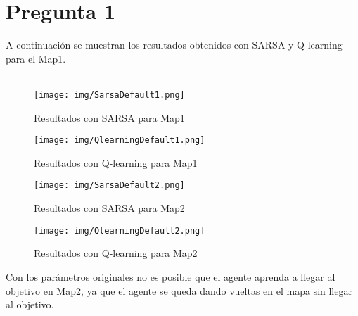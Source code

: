 \documentclass[
	spanish, %
	oneside
]{article}
\begin{document}
\newpage
\section*{Pregunta 1}

\noindent A continuación se muestran los resultados obtenidos con SARSA y Q-learning para el Map1. 
\\ \\ 

\begin{figure}[H]
	\centering
	\texttt{[image: img/SarsaDefault1.png]}
	\caption{Resultados con SARSA para Map1}
	\label{fig:map1_sarsa}
\end{figure}

\begin{figure}[H]
	\centering
	\texttt{[image: img/QlearningDefault1.png]}
	\caption{Resultados con Q-learning para Map1}
	\label{fig:map1_qlearning}
\end{figure}


\newpage
{}

\begin{figure}[H]
	\centering
	\texttt{[image: img/SarsaDefault2.png]}
	\caption{Resultados con SARSA para Map2}
	\label{fig:map2_sarsa}
\end{figure}

\begin{figure}[H]
	\centering
	\texttt{[image: img/QlearningDefault2.png]}
	\caption{Resultados con Q-learning para Map2}
	\label{fig:map2_qlearning}
\end{figure}

\noindent Con los parámetros originales no es posible que el agente aprenda a llegar al objetivo en Map2, ya que el agente se queda dando vueltas en el mapa sin llegar al objetivo. \\


\\
\end{document}

